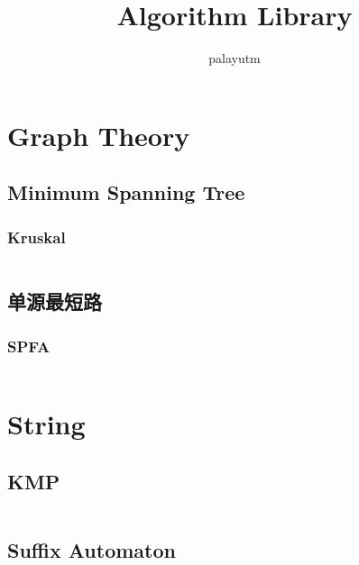 \documentclass[a4paper,11pt]{article}
\author{palayutm}
\title{Algorithm Library}
\begin{document}
 
\maketitle %
\newpage %
\tableofcontents %
\newpage
\section{Graph Theory} %
\subsection{Minimum Spanning Tree} %
\subsubsection{Kruskal} %
\inputminted[breaklines]{c++}{graph/kruskal.cc} %
\subsection{单源最短路}
\subsubsection{SPFA}
\inputminted[breaklines]{c++}{graph/spfa.cc}

\twocolumn  %
\newpage
\section{String}
\subsection{KMP}
\inputminted[breaklines]{c++}{string/kmp.cc}

\subsection{Suffix Automaton}
\inputminted[breaklines]{c++}{string/suffix-automaton.cc}

\end{document}
